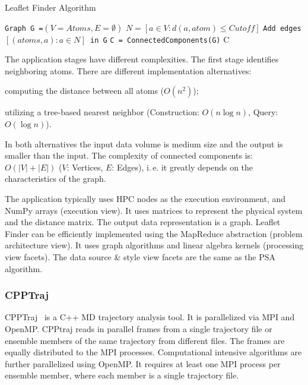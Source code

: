\begin{algorithm}[ht]
    \scriptsize
    \caption{Leaflet Finder Algorithm}
    \label{alg:leafletfinder}
    \begin{algorithmic}[1]
        \State \texttt{Graph G =$(V=Atoms,E=\emptyset)$}
        \State \texttt{$N = [a\in V: d(a,atom)\le Cutoff]$}
        \State \texttt{Add edges $[(atoms,a): a \in N]$ in G}
        \EndFor
        \State \texttt{C = ConnectedComponents(G)}
        \State \Return C
        \EndProcedure
    \end{algorithmic}
\end{algorithm}

The application stages have different complexities.
The first stage identifies neighboring atoms.
There are different implementation alternatives: 
\begin{inparaenum}[i)]
    \item computing the distance between all atoms ($O(n^2)$);
    \item utilizing a tree-based nearest neighbor (Construction: $O(n\log n)$, 
    Query: $O(\log n)$).
\end{inparaenum}
In both alternatives the input data volume is medium size and the output is smaller than the input.
The complexity of connected components is: $O(|V|+|E|)$ ($V$: Vertices, $E$: Edges), i.\,e. it greatly depends on the characteristics of the graph.

The application typically uses HPC nodes as the execution environment, and NumPy arrays (execution view).
It uses matrices to represent the physical system and the distance matrix.
The output data representation is a graph.
Leaflet Finder can be efficiently implemented using the MapReduce abstraction (problem architecture view).
It uses graph algorithms and linear algebra kernels (processing view facets).
The data source \& style view facets are the same as the PSA algorithm.

\subsubsection{CPPTraj}
CPPTraj~\cite{roe2013ptraj,roe2018parallelization} is a C++ MD trajectory analysis tool.
It is parallelized via MPI and OpenMP.
CPPtraj reads in parallel frames from a single trajectory file or ensemble members of the same trajectory from different files.
The frames are equally distributed to the MPI processes.
Computational intensive algorithms are further parallelized using OpenMP.
It requires at least one MPI process per ensemble member, where each member is a single trajectory file.


